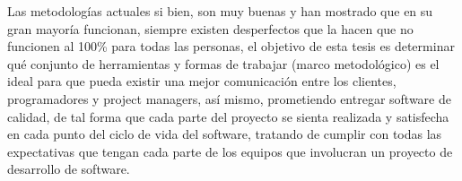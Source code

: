 Las metodologías actuales si bien, son muy buenas y han mostrado que en su gran mayoría
funcionan, siempre existen desperfectos que la hacen que no funcionen al 100\% para todas
las personas, el objetivo de esta tesis es determinar qué conjunto de herramientas y formas
de trabajar (marco metodológico) es el ideal para que pueda existir una mejor comunicación
entre los clientes, programadores y project managers, así mismo, prometiendo entregar
software de calidad, de tal forma que cada parte del proyecto se sienta realizada y
satisfecha en cada punto del ciclo de vida del software, tratando de cumplir con todas las
expectativas que tengan cada parte de los equipos que involucran un proyecto de desarrollo
de software.